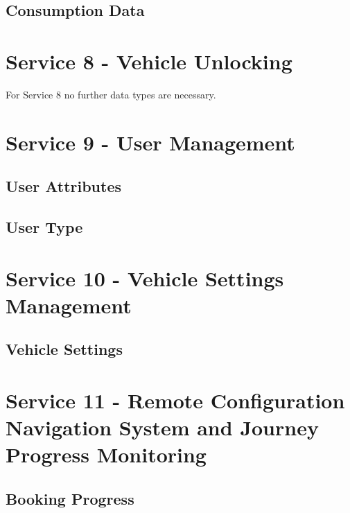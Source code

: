 \subsection*{Consumption Data}



\section{Service 8 - Vehicle Unlocking}
\label{sec:Datenmodell:Dienst8}
For Service 8 no further data types are necessary.

\section{Service 9 - User Management}
\label{sec:Datenmodell:Dienst9}

\subsection*{User Attributes}



\subsection*{User Type}



\section{Service 10 - Vehicle Settings Management}
\label{sec:Datenmodell:Dienst10}

\subsection*{Vehicle Settings}



\section{Service 11 - Remote Configuration Navigation System and Journey Progress Monitoring}
\label{sec:Datenmodell:Dienst11}

\subsection*{Booking Progress}




